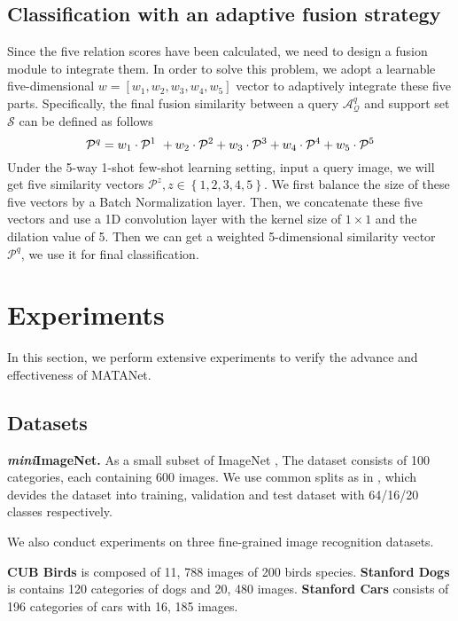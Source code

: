 \documentclass[final]{cvpr}
\begin{document}
	






	\subsection{Classification with an adaptive fusion strategy}
	
	Since the five relation scores have been calculated, we need to design a fusion module to integrate them. In order to solve this problem, we adopt a learnable five-dimensional $w=[w_1, w_2, w_3, w_4, w_5]$ vector to adaptively integrate these five parts. Specifically, the final fusion similarity between a query $\mathcal{A}^q_\mathcal{Q}$ and support set $\mathcal{S}$ can be defined as follows
	\begin{equation}
		\mathcal{P}^q = w_1 \cdot \mathcal{P}^{1}\ + w_2 \cdot 	\mathcal{P}^{2}+w_3 \cdot \mathcal{P}^{3}\ \\
		+ w_4 \cdot 	\mathcal{P}^{4} +w_5 \cdot 	\mathcal{P}^{5} 
	\end{equation}
	Under the 5-way 1-shot few-shot learning setting, input a query image, we will get  five similarity vectors $\mathcal{P}^{z}, z\in\left\{1,2,3,4,5\right\}$. We first balance the size of these five vectors by a Batch Normalization layer. Then, we concatenate these five vectors and use a 1D convolution layer with the kernel size of $1\times1$ and the dilation value of 5. Then we can get a weighted 5-dimensional similarity vector $\mathcal{P}^q$, we use it for final classification. 
		
	\section{Experiments}
	In this section, we perform extensive experiments to verify the advance and effectiveness of MATANet. 
	\subsection{Datasets}
	\textbf{\emph{mini}ImageNet.} As a small subset of ImageNet \cite{deng2009imagenet}, The dataset consists of 100 categories, each containing 600 images. We use common splits as in \cite{finn2017model}, which devides the dataset into training, validation and test dataset with 64/16/20 classes respectively.
	
	We also conduct experiments on three fine-grained image recognition datasets. 	
	
	\textbf{CUB Birds} \cite{wah2011caltech} is composed of 11, 788 images of 200 birds species. 
	\textbf{Stanford Dogs} \cite{khosla2011novel} is contains 120 categories of dogs and 20, 480 images. 
	\textbf{Stanford Cars} \cite{krause20133d} consists of 196 categories of cars with 16, 185 images. 	
	
\end{document}

